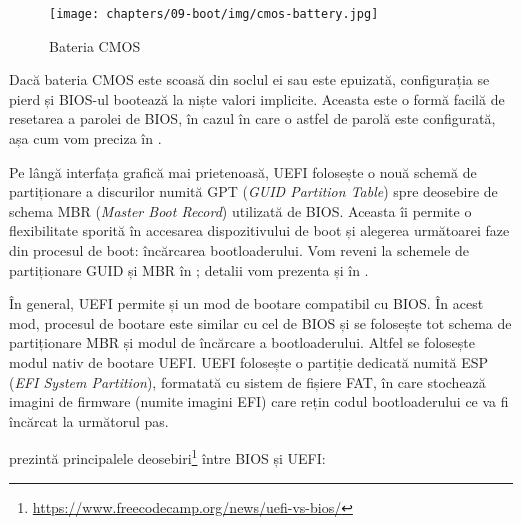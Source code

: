 \begin{figure}[!htbp]
  \centering
  \texttt{[image: chapters/09-boot/img/cmos-battery.jpg]}
  \caption{Bateria CMOS}
  \label{fig:boot:cmos-battery}
\end{figure}

Dacă bateria CMOS este scoasă din soclul ei sau este epuizată, configurația se pierd și BIOS-ul bootează la niște valori implicite.
Aceasta este o formă facilă de resetarea a parolei de BIOS, în cazul în care o astfel de parolă este configurată, așa cum vom preciza în .

Pe lângă interfața grafică mai prietenoasă, UEFI folosește o nouă schemă de partiționare a discurilor numită GPT  (\textit{GUID Partition Table}) spre deosebire de schema MBR  (\textit{Master Boot Record}) utilizată de BIOS.
Aceasta îi permite o flexibilitate sporită în accesarea dispozitivului de boot și alegerea următoarei faze din procesul de boot: încărcarea bootloaderului.
Vom reveni la schemele de partiționare GUID și MBR în ;
detalii vom prezenta și în .

În general, UEFI permite și un mod de bootare compatibil cu BIOS.
În acest mod, procesul de bootare este similar cu cel de BIOS și se folosește tot schema de partiționare MBR și modul de încărcare a bootloaderului.
Altfel se folosește modul nativ de bootare UEFI.
UEFI folosește o partiție dedicată numită ESP  (\textit{EFI System Partition}), formatată cu sistem de fișiere FAT, în care stochează imagini de firmware (numite imagini EFI) care rețin codul bootloaderului ce va fi încărcat la următorul pas.

 prezintă principalele deosebiri\footnote{\url{https://www.freecodecamp.org/news/uefi-vs-bios/}} între BIOS și UEFI:

